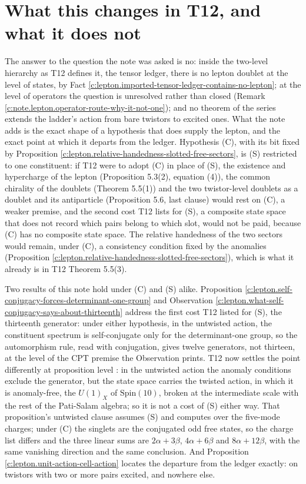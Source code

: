 \documentclass[11pt]{article}
\theoremstyle{definition}
\theoremstyle{plain}
\begin{document}
\section{What this changes in T12, and what it does not}

\label{c:note.lepton.setting-what-changes-t12-what-it}
The answer to the question the note was asked is no: inside the two-level hierarchy as T12 defines it, the tensor ledger, there is no lepton doublet at the level of states, by Fact \ref{c:lepton.imported-tensor-ledger-contains-no-lepton}; at the level of operators the question is unresolved rather than closed (Remark \ref{c:note.lepton.operator-route-why-it-not-one}); and no theorem of the series extends the ladder's action from bare twistors to excited ones. What the note adds is the exact shape of a hypothesis that does supply the lepton, and the exact point at which it departs from the ledger. Hypothesis (C), with its bit fixed by Proposition \ref{c:lepton.relative-handedness-slotted-free-sectors}, is (S) restricted to one constituent: if T12 were to adopt (C) in place of (S), the existence and hypercharge of the lepton (Proposition 5.3(2), equation (4)), the common chirality of the doublets (Theorem 5.5(1)) and the two twistor-level doublets as a doublet and its antiparticle (Proposition 5.6, last clause) would rest on (C), a weaker premise, and the second cost T12 lists for (S), a composite state space that does not record which pairs belong to which slot, would not be paid, because (C) has no composite state space. The relative handedness of the two sectors would remain, under (C), a consistency condition fixed by the anomalies (Proposition \ref{c:lepton.relative-handedness-slotted-free-sectors}), which is what it already is in T12 Theorem 5.5(3).

Two results of this note hold under (C) and (S) alike. Proposition \ref{c:lepton.self-conjugacy-forces-determinant-one-group} and Observation \ref{c:lepton.what-self-conjugacy-says-about-thirteenth} address the first cost T12 listed for (S), the thirteenth generator: under either hypothesis, in the untwisted action, the constituent spectrum is self-conjugate only for the determinant-one group, so the automorphism rule, read with conjugation, gives twelve generators, not thirteen, at the level of the CPT premise the Observation prints. T12 now settles the point differently at proposition level \cite[Prop.~5.8(3), Prop.~10.7]{ButlerT12}: in the untwisted action the anomaly conditions exclude the generator, but the state space carries the twisted action, in which it is anomaly-free, the $U(1)_{X}$ of $\mathrm{Spin}(10)$, broken at the intermediate scale with the rest of the Pati-Salam algebra; so it is not a cost of (S) either way. That proposition's untwisted clause assumes (S) and computes over the five-mode charges; under (C) the singlets are the conjugated odd free states, so the charge list differs and the three linear sums are $2\alpha + 3\beta$, $4\alpha + 6\beta$ and $8\alpha + 12\beta$, with the same vanishing direction and the same conclusion. And Proposition \ref{c:lepton.unit-action-cell-action} locates the departure from the ledger exactly: on twistors with two or more pairs excited, and nowhere else.
\end{document}
